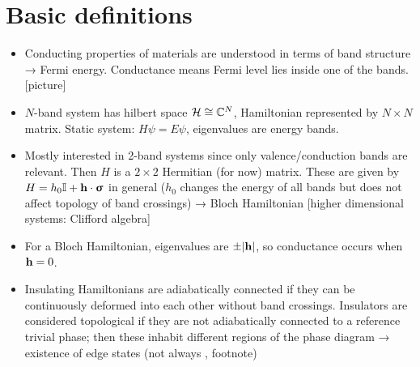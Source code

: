 \label{chap:topo-states}




\section{Basic definitions}
{\color{blue}
\begin{itemize}
	\item Conducting properties of materials are understood in terms of band structure → Fermi energy. Conductance means Fermi level lies inside one of the bands. [picture]
	
	\item $N$-band system has hilbert space $\mathcal{H}\cong\mathbb{C}^N$, Hamiltonian represented by $N\times N$ matrix. Static system: $H\psi = E\psi$, eigenvalues are energy bands.
	
	\item Mostly interested in 2-band systems since only valence/conduction bands are relevant. Then $H$ is a $2\times 2$ Hermitian (for now) matrix. These are given by $H = h_0\mathbb{I} + \vb{h}\cdot\bm{\upsigma}$ in general ($h_0$ changes the energy of all bands but does not affect topology of band crossings) → Bloch Hamiltonian [higher dimensional systems: Clifford algebra]
	
	\item For a Bloch Hamiltonian, eigenvalues are $\pm\abs{\vb{h}}$, so conductance occurs when $\vb{h} = 0$.
	
	\item Insulating Hamiltonians are adiabatically connected if they can be continuously deformed into each other without band crossings. Insulators are considered topological if they are not adiabatically connected to a reference trivial phase; then these inhabit different regions of the phase diagram → existence of edge states (not always \cite{Bernevig_topological-insulators}, footnote)
\end{itemize}
}

